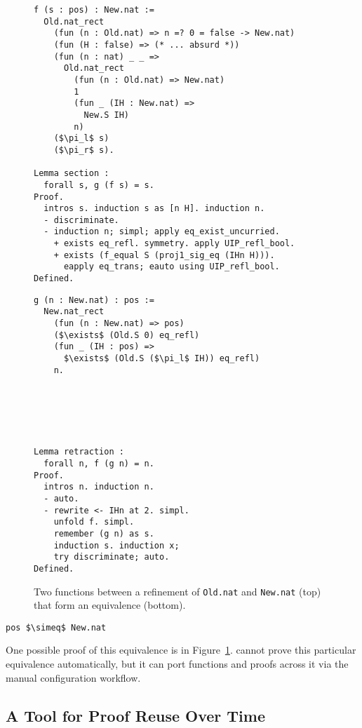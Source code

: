 \begin{figure}
\begin{minipage}{0.60\textwidth}
\begin{lstlisting}
f (s : pos) : New.nat :=
  Old.nat_rect
    (fun (n : Old.nat) => n =? 0 = false -> New.nat)
    (fun (H : false) => (* ... absurd *))
    (fun (n : nat) _ _ =>
      Old.nat_rect
        (fun (n : Old.nat) => New.nat)
        1
        (fun _ (IH : New.nat) =>
          New.S IH)
        n)
    ($\pi_l$ s)
    ($\pi_r$ s).

Lemma section :
  forall s, g (f s) = s.
Proof.
  intros s. induction s as [n H]. induction n.
  - discriminate.
  - induction n; simpl; apply eq_exist_uncurried. 
    + exists eq_refl. symmetry. apply UIP_refl_bool.
    + exists (f_equal S (proj1_sig_eq (IHn H))). 
      eapply eq_trans; eauto using UIP_refl_bool.
Defined.
\end{lstlisting}
\end{minipage}
\hfill
\begin{minipage}{0.38\textwidth}
\begin{lstlisting}
g (n : New.nat) : pos :=
  New.nat_rect
    (fun (n : New.nat) => pos)
    ($\exists$ (Old.S 0) eq_refl)
    (fun _ (IH : pos) =>
      $\exists$ (Old.S ($\pi_l$ IH)) eq_refl)
    n.






Lemma retraction :
  forall n, f (g n) = n.
Proof.
  intros n. induction n.
  - auto.
  - rewrite <- IHn at 2. simpl. 
    unfold f. simpl.
    remember (g n) as s.
    induction s. induction x;
    try discriminate; auto.
Defined.
\end{lstlisting}
\end{minipage}
\caption{Two functions between a refinement of \lstinline{Old.nat} and \lstinline{New.nat} (top) that form an equivalence (bottom).}
\label{fig:equivalence2}
\end{figure}

\begin{lstlisting}
pos $\simeq$ New.nat 
\end{lstlisting}
One possible proof of this equivalence is in Figure~\ref{fig:equivalence2}.
\toolname cannot prove this particular equivalence automatically, but it can
port functions and proofs across it via the manual configuration workflow. %

\subsection{A Tool for Proof Reuse Over Time}
\label{sec:time}

